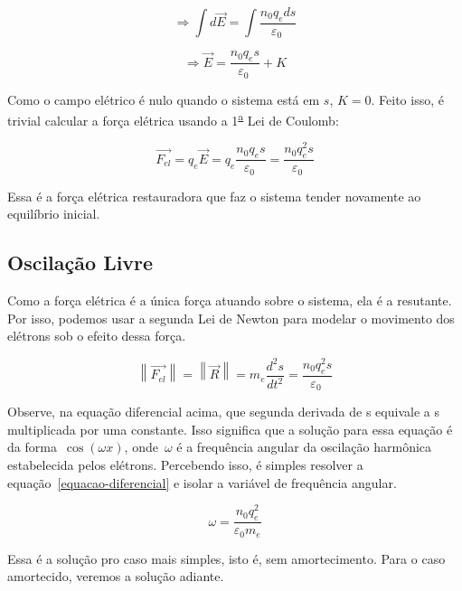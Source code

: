 \documentclass[
	article,
	11pt,
	oneside,
	a4paper,
	english,
	brazil,
	sumario=tradicional
	]{abntex2}
\newcommand{\norm}[1]{\left\lVert#1\right\rVert}
\begin{document}
\begin{equation}
  \Rightarrow \int d\vec{E} = \int \frac{n_0 q_e ds}{\varepsilon _0~}
\end{equation}

\begin{equation} \label{campo-eletrico}
  \Rightarrow \vec{E} = \frac{n_0 q_e s}{\varepsilon _0~} + K
\end{equation}

Como o campo elétrico é nulo quando o sistema está em $s$, $K=0$. Feito isso, é trivial calcular a força elétrica usando a 1\textsuperscript{\underline{a}} Lei de Coulomb:

\begin{equation} \label{forca-restauradora}
  \vec{F_{el}} = q_e\vec{E} = q_e \frac{n_0 q_e s}{\varepsilon _0~} = \frac{n_0 q_e^2 s}{\varepsilon _0~}
\end{equation}

Essa é a força elétrica restauradora que faz o sistema tender novamente ao equilíbrio inicial.

\subsection{Oscilação Livre}

Como a força elétrica é a única força atuando sobre o sistema, ela é a resutante. Por isso, podemos usar a segunda Lei de Newton para modelar o movimento dos elétrons sob o efeito dessa força.

\begin{equation} \label{equacao-diferencial}
  \norm{\vec{F_{el}}} = \norm{\vec{R}}= m_e \frac{d^2s}{dt^2} = \frac{n_0 q_e^2 s}{\varepsilon _0~}
\end{equation}

Observe, na equação diferencial acima, que segunda derivada de s equivale a s multiplicada por uma constante. Isso significa que a solução para essa equação é da forma~$\cos(\omega x)$, onde~$\omega$ é a frequência angular da oscilação harmônica estabelecida pelos elétrons. Percebendo isso, é simples resolver a equação~\ref{equacao-diferencial} e isolar a variável de frequência angular.

\begin{equation}
  \omega = \frac{n_0 q_e^2}{\varepsilon_0 m_e}
\end{equation}

Essa é a solução pro caso mais simples, isto é, sem amortecimento. Para o caso amortecido, veremos a solução adiante.
\end{document}
